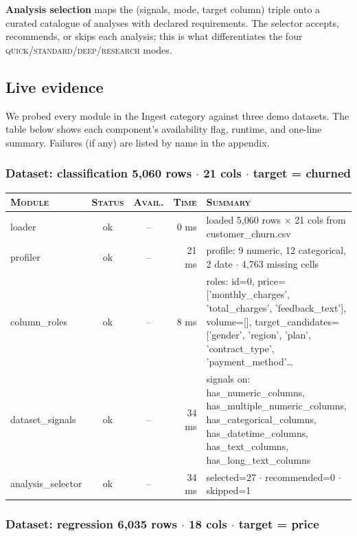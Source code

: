 \documentclass[11pt,a4paper]{article}
\begin{document}
\textbf{Analysis selection} maps the (signals, mode, target column) triple onto a curated catalogue of analyses with declared requirements. The selector accepts, recommends, or skips each analysis; this is what differentiates the four \textsc{quick}/\textsc{standard}/\textsc{deep}/\textsc{research} modes.

\subsection{Live evidence}

We probed every module in the Ingest category against three
demo datasets. The table below shows each component's availability flag,
runtime, and one-line summary. Failures (if any) are listed by name in the
appendix.


\subsubsection*{Dataset: classification
\hfill {\color{ink3}\footnotesize 5,060 rows
{$\boldsymbol{\cdot}$} 21 cols
{$\boldsymbol{\cdot}$} target = churned}}

\begin{tabularx}{\linewidth}{l c c r X}
\toprule
\textsc{Module} & \textsc{Status} & \textsc{Avail.} & \textsc{Time} & \textsc{Summary} \\
\midrule
loader & \textcolor{ok}{ok} & -- & 0 ms & loaded 5,060 rows $\times$ 21 cols from customer\_churn.csv \\
profiler & \textcolor{ok}{ok} & -- & 21 ms & profile: 9 numeric, 12 categorical, 2 date $\cdot$ 4,763 missing cells \\
column\_roles & \textcolor{ok}{ok} & -- & 8 ms & roles: id=0, price=['monthly\_charges', 'total\_charges', 'feedback\_text'], volume=[], target\_candidates=['gender', 'region', 'plan', 'contract\_type', 'payment\_method'\ldots{} \\
dataset\_signals & \textcolor{ok}{ok} & -- & 34 ms & signals on: has\_numeric\_columns, has\_multiple\_numeric\_columns, has\_categorical\_columns, has\_datetime\_columns, has\_text\_columns, has\_long\_text\_columns \\
analysis\_selector & \textcolor{ok}{ok} & -- & 34 ms & selected=27 $\cdot$ recommended=0 $\cdot$ skipped=1 \\
\bottomrule
\end{tabularx}


\subsubsection*{Dataset: regression
\hfill {\color{ink3}\footnotesize 6,035 rows
{$\boldsymbol{\cdot}$} 18 cols
{$\boldsymbol{\cdot}$} target = price}}
\end{document}
